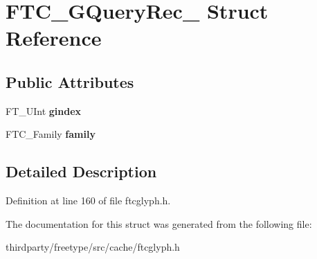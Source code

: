 \hypertarget{struct_f_t_c___g_query_rec__}{}\section{F\+T\+C\+\_\+\+G\+Query\+Rec\+\_\+ Struct Reference}
\label{struct_f_t_c___g_query_rec__}
\subsection*{Public Attributes}
\begin{DoxyCompactItemize}
\item 
\mbox{\label{struct_f_t_c___g_query_rec___a4f78d9b44f1442aa04c581ee044bd577}} 
F\+T\+\_\+\+U\+Int {\bfseries gindex}
\item 
\mbox{\label{struct_f_t_c___g_query_rec___a0e36befb15d9fca397542c5e1fff4263}} 
F\+T\+C\+\_\+\+Family {\bfseries family}
\end{DoxyCompactItemize}


\subsection{Detailed Description}


Definition at line 160 of file ftcglyph.\+h.



The documentation for this struct was generated from the following file\+:\begin{DoxyCompactItemize}
\item 
thirdparty/freetype/src/cache/ftcglyph.\+h\end{DoxyCompactItemize}
